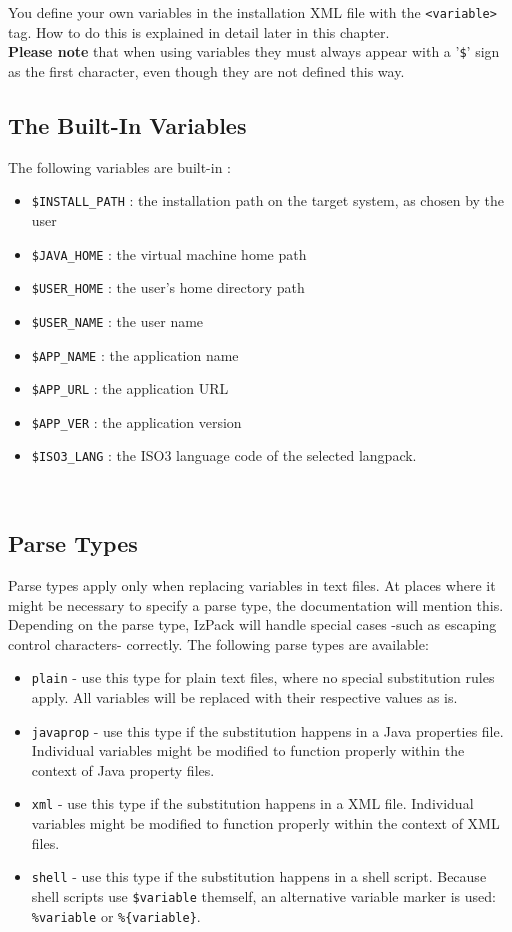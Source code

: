 You define your own variables in the installation XML file with the
\texttt{<variable>} tag. How to do this is explained in detail later in
this chapter.\\

\textbf{Please note} that when using variables they must always appear
with a '\texttt{\$}' sign as the first character, even though they are
not defined this way.\\

\subsection{The Built-In Variables}
The following variables are built-in :
\begin{itemize}
  \item \texttt{\$INSTALL\_PATH} : the installation path on the
        target system, as chosen by the user
  \item \texttt{\$JAVA\_HOME} : the \Java virtual machine home path
  \item \texttt{\$USER\_HOME} : the user's home directory path
  \item \texttt{\$USER\_NAME} : the user name
  \item \texttt{\$APP\_NAME} : the application name
  \item \texttt{\$APP\_URL} : the application URL
  \item \texttt{\$APP\_VER} : the application version
  \item \texttt{\$ISO3\_LANG} : the ISO3 language code of the selected langpack.
\end{itemize}\

\subsection{Parse Types}
Parse types apply only when replacing variables in text files. At places
where it might be necessary to specify a parse type, the documentation
will mention this. Depending on the parse type, IzPack will handle
special cases -such as escaping control characters- correctly. The
following parse types are available:
\begin{itemize}
  \item \texttt{plain} - use this type for plain text files, where no
        special substitution rules apply. All variables will be
        replaced with their respective values as is.
  \item \texttt{javaprop} - use this type if the substitution happens
        in a Java properties file. Individual variables might be
        modified to function properly within the context of Java
        property files.
  \item \texttt{xml} - use this type if the substitution happens in
        a XML file. Individual variables might be modified to function
        properly within the context of XML files.
  \item \texttt{shell} - use this type if the substitution happens in
        a shell script. Because shell scripts use \texttt{\$variable} 
        themself, an alternative variable marker is used: 
        \texttt{\%variable} or \texttt{\%\{variable\}}.
\end{itemize}

